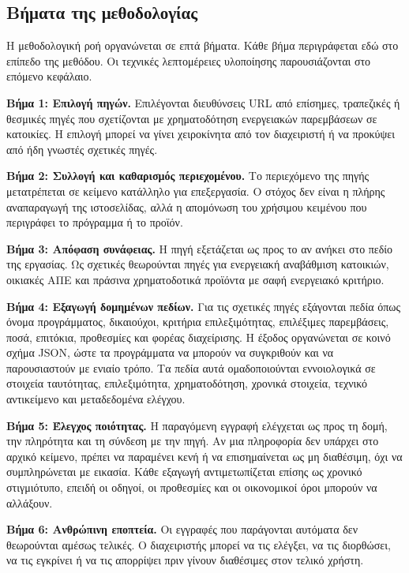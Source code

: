 \subsection{Βήματα της μεθοδολογίας}

Η μεθοδολογική ροή οργανώνεται σε επτά βήματα. Κάθε βήμα περιγράφεται εδώ στο
επίπεδο της μεθόδου. Οι τεχνικές λεπτομέρειες υλοποίησης παρουσιάζονται στο
επόμενο κεφάλαιο.

\textbf{Βήμα 1: Επιλογή πηγών.}
Επιλέγονται διευθύνσεις URL από επίσημες, τραπεζικές ή θεσμικές πηγές που σχετίζονται με
χρηματοδότηση ενεργειακών παρεμβάσεων σε κατοικίες. Η επιλογή μπορεί να γίνει
χειροκίνητα από τον διαχειριστή ή να προκύψει από ήδη γνωστές σχετικές πηγές.

\textbf{Βήμα 2: Συλλογή και καθαρισμός περιεχομένου.}
Το περιεχόμενο της πηγής μετατρέπεται σε κείμενο κατάλληλο για επεξεργασία. Ο
στόχος δεν είναι η πλήρης αναπαραγωγή της ιστοσελίδας, αλλά η απομόνωση του
χρήσιμου κειμένου που περιγράφει το πρόγραμμα ή το προϊόν.

\textbf{Βήμα 3: Απόφαση συνάφειας.}
Η πηγή εξετάζεται ως προς το αν ανήκει στο πεδίο της εργασίας. Ως σχετικές
θεωρούνται πηγές για ενεργειακή αναβάθμιση κατοικιών, οικιακές ΑΠΕ και πράσινα
χρηματοδοτικά προϊόντα με σαφή ενεργειακό κριτήριο.

\textbf{Βήμα 4: Εξαγωγή δομημένων πεδίων.}
Για τις σχετικές πηγές εξάγονται πεδία όπως όνομα προγράμματος, δικαιούχοι,
κριτήρια επιλεξιμότητας, επιλέξιμες παρεμβάσεις, ποσά, επιτόκια, προθεσμίες
και φορέας διαχείρισης. Η έξοδος οργανώνεται σε κοινό σχήμα JSON, ώστε τα
προγράμματα να μπορούν να συγκριθούν και να παρουσιαστούν με ενιαίο τρόπο.
Τα πεδία αυτά ομαδοποιούνται εννοιολογικά σε στοιχεία ταυτότητας, επιλεξιμότητα,
χρηματοδότηση, χρονικά στοιχεία, τεχνικό αντικείμενο και μεταδεδομένα ελέγχου.

\textbf{Βήμα 5: Έλεγχος ποιότητας.}
Η παραγόμενη εγγραφή ελέγχεται ως προς τη δομή, την πληρότητα και τη σύνδεση με
την πηγή. Αν μια πληροφορία δεν υπάρχει στο αρχικό κείμενο, πρέπει να παραμένει
κενή ή να επισημαίνεται ως μη διαθέσιμη, όχι να συμπληρώνεται με εικασία.
Κάθε εξαγωγή αντιμετωπίζεται επίσης ως χρονικό στιγμιότυπο, επειδή οι οδηγοί,
οι προθεσμίες και οι οικονομικοί όροι μπορούν να αλλάξουν.

\textbf{Βήμα 6: Ανθρώπινη εποπτεία.}
Οι εγγραφές που παράγονται αυτόματα δεν θεωρούνται αμέσως τελικές. Ο
διαχειριστής μπορεί να τις ελέγξει, να τις διορθώσει, να τις εγκρίνει ή να τις
απορρίψει πριν γίνουν διαθέσιμες στον τελικό χρήστη.

